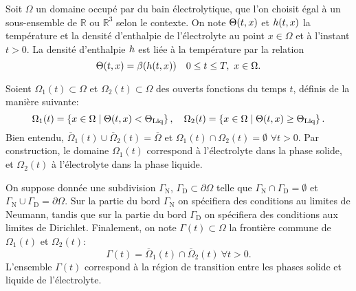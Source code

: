 Soit $\Omega$ un domaine occupé par du bain électrolytique, que l'on
choisit égal à un sous-ensemble de $\mathbb R$ ou $\mathbb R^3$ selon
le contexte. On note $\Theta(t, x)$ et $h(t, x)$
la température et la densité d'enthalpie de l'électrolyte au point $x
\in \Omega$ et à l'instant $t > 0$. La densité d'enthalpie
$h$ est liée à la température par la relation
\begin{equation}
  \Theta(t, x) = \beta(h(t, x)) \quad 0\leq t\leq
  T,\ x\in\Omega.
\end{equation}

Soient $\Omega_1(t)\subset \Omega$ et $\Omega_2(t)\subset \Omega$
des ouverts fonctions du temps $t$, définis de la manière suivante:
\begin{equation}\label{eq:phase-domains}
  \Omega_1(t) = \cparent{x\in\Omega \mid %
                         \temperature(t, x) < \tliq},\quad %
  \Omega_2(t) = \cparent{x\in\Omega \mid \temperature(t, x) %
                         \geq \tliq}.
\end{equation}
Bien entendu, $\overline\Omega_1(t)\cup \overline\Omega_2(t) =
\overline\Omega$ et $\Omega_1(t) \cap \Omega_2(t) = \emptyset$
$\forall t > 0$. Par construction, le domaine $\Omega_1(t)$ correspond
à l'électrolyte dans la phase solide, et $\Omega_2(t)$ à l'électrolyte
dans la phase liquide.

On suppose donnée une subdivision $\Gamma_\mathrm{N}$,
$\Gamma_\mathrm{D}\subset \partial \Omega$ telle que
$\Gamma_\mathrm{N}\cap \Gamma_\mathrm{D} = \emptyset$ et
$\Gamma_\mathrm{N}\cup \Gamma_\mathrm{D} = \partial \Omega$. Sur la
partie du bord $\Gamma_\mathrm{N}$ on spécifiera des conditions au
limites de Neumann, tandis que sur la partie du bord
$\Gamma_\mathrm{D}$ on spécifiera des conditions aux limites de
Dirichlet. Finalement, on note $\Gamma(t)\subset \Omega$ la frontière
commune de $\Omega_1(t)$ et $\Omega_2(t)$:
\begin{equation}\label{eq:phase-frontier}
  \Gamma(t) = \overline \Omega_1(t)\cap\overline \Omega_2(t)\ \forall
  t > 0.
\end{equation}
L'ensemble $\Gamma(t)$ correspond à la région de transition entre les
phases solide et liquide de l'électrolyte.

